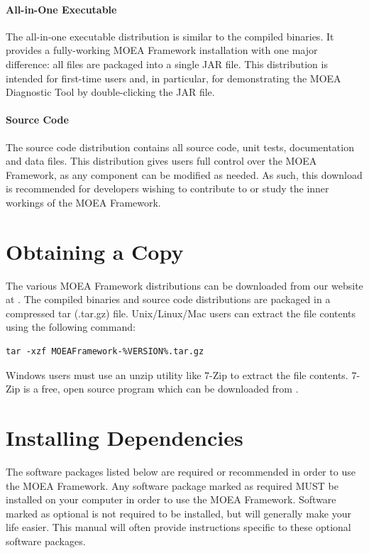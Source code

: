 \paragraph{All-in-One Executable}
The all-in-one executable distribution is similar to the compiled binaries.  It provides a fully-working MOEA Framework installation with one major difference: all files are packaged into a single JAR file.  This distribution is intended for first-time users and, in particular, for demonstrating the MOEA Diagnostic Tool by double-clicking the JAR file.

\paragraph{Source Code}
The source code distribution contains all source code, unit tests, documentation and data files.  This distribution gives users full control over the MOEA Framework, as any component can be modified as needed.  As such, this download is recommended for developers wishing to contribute to or study the inner workings of the MOEA Framework.

\section{Obtaining a Copy}

The various MOEA Framework distributions can be downloaded from our website at .  The compiled binaries and source code distributions are packaged in a compressed tar (.tar.gz) file.  Unix/Linux/Mac users can extract the file contents using the following command:

\begin{lstlisting}[language=Plaintext]
tar -xzf MOEAFramework-%VERSION%.tar.gz
\end{lstlisting}

Windows users must use an unzip utility like 7-Zip to extract the file contents.  7-Zip is a free, open source program which can be downloaded from .

\section{Installing Dependencies}

The software packages listed below are required or recommended in order to use the MOEA Framework.  Any software package marked as required MUST be installed on your computer in order to use the MOEA Framework.  Software marked as optional is not required to be installed, but will generally make your life easier.  This manual will often provide instructions specific to these optional software packages.

